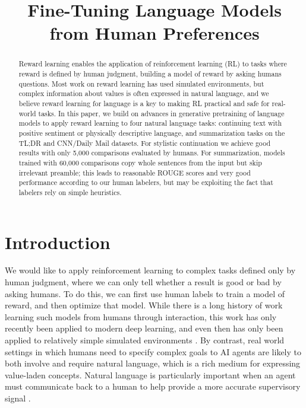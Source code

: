 \title{Fine-Tuning Language Models from Human Preferences}

\begin{abstract}
Reward learning enables the application of reinforcement learning (RL) to tasks where reward is defined by human judgment, building a model of reward by asking humans questions. Most work on reward learning has used simulated environments, but complex information about values is often expressed in natural language, and we believe reward learning for language is a key to making RL practical and safe for real-world tasks.  In this paper, we build on advances in generative pretraining of language models to apply reward learning to four natural language tasks: continuing text with positive sentiment or physically descriptive language, and summarization tasks on the TL;DR and CNN/Daily Mail datasets.  For stylistic continuation we achieve good results with only 5,000 comparisons evaluated by humans.  For summarization, models trained with 60,000 comparisons copy whole sentences from the input but skip irrelevant preamble; this leads to reasonable ROUGE scores and very good performance according to our human labelers, but may be exploiting the fact that labelers rely on simple heuristics.
\end{abstract}

\section{Introduction}

We would like to apply reinforcement learning to complex tasks defined only by human judgment, where we can only tell whether a result is good or bad by asking humans.  To do this, we can first use human labels to train a model of reward, and then optimize that model.  While there is a long history of work learning such models from humans through interaction, this work has only recently been applied to modern deep learning, and even then has only been applied to relatively simple simulated environments \citep{christiano2017deep,ibarz2018,bahdanau2018learning}.  By contrast, real world settings in which humans need to specify complex goals to AI agents are likely to both involve and require natural language, which is a rich medium for expressing value-laden concepts.  Natural language is particularly important when an agent must communicate back to a human to help provide a more accurate supervisory signal \citep{irving2018debate,christiano2018amplification,leike2018scalable}.

